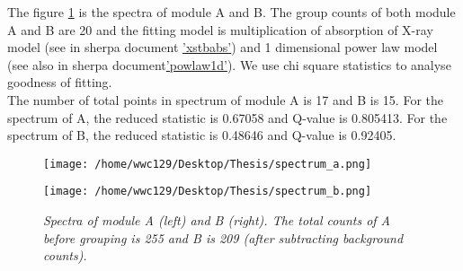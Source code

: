 \documentclass[12pt]{report}
\newcommand{\mycaption}[1]{\caption{\textit{\footnotesize #1}}}
\begin{document}
        The figure \ref{spectra} is the spectra of module A and B. The group counts of both module A and B are
        20 and the fitting model is multiplication of absorption of X-ray model (see in sherpa document 
        \href{http://%
        cxc.harvard.edu/sherpa/ahelp/xstbabs.html}{'xstbabs'}) and 1 dimensional power law model (see also in sherpa 
        document\href{http://cxc.harvard.edu/sherpa/ahelp/powlaw1d.html}{'powlaw1d'}). We use chi square statistics
        to analyse goodness of fitting.\\
        \indent
        The number of total points in spectrum of module A is 17 and B is 15. For the spectrum of A, the 
        reduced statistic is 0.67058 and Q-value is 0.805413. For the spectrum of B, the reduced statistic is 0.48646
        and Q-value is 0.92405. \newpage 
        \begin{figure}[!ht]
          \begin{minipage}[c]{0.45\textwidth}
            \begin{flushleft} 
                \texttt{[image: /home/wwc129/Desktop/Thesis/spectrum\_a.png]}
            \end{flushleft}
            \end{minipage}
          \begin{minipage}{0.45\textwidth}
            \begin{flushleft}
            \texttt{[image: /home/wwc129/Desktop/Thesis/spectrum\_b.png]}
            \end{flushleft}
          \end{minipage}
          \centering
          \begin{minipage}{0.8\textwidth}
          \mycaption{Spectra of module A (left) and B (right). The total counts of A before grouping is 
                      255 and B is 209 (after subtracting background counts).}
          \label{spectra}
          \end{minipage}
          \end{figure}
        













		
			

    
\end{document}

